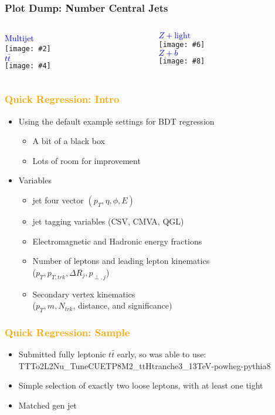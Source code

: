 \documentclass{beamer}
\newcommand{\fourfigs}[8]{
  \begin{columns}
    \begin{column}{0.3\linewidth}
      \centering
      \textcolor{blue}{#1} \\
      \texttt{[image: \#2]} \\
      \textcolor{blue}{#3} \\
      \texttt{[image: \#4]}
    \end{column}
    \begin{column}{0.3\linewidth}
      \centering
      \textcolor{blue}{#5} \\
      \texttt{[image: \#6]} \\
      \textcolor{blue}{#7} \\
      \texttt{[image: \#8]}
    \end{column}
}
\newcommand{\ttbar}{\ensuremath{t\bar{t}} \hspace{2pt}}
\begin{document}
\begin{frame}
  \frametitle{Plot Dump: Number Central Jets}
  \fourfigs{Multijet}
           {171201/ZvvHbb_multijet_nJet.pdf}
           {\ttbar}
           {171201/ZvvHbb_scaledtt_nJet.pdf}
           {$Z + \mathrm{light}$}
           {171201/ZvvHbb_lightz_nJet.pdf}
           {$Z + b$}
           {171201/ZvvHbb_heavyz_nJet.pdf}
  \end{columns}
\end{frame}

\begin{frame}
  \frametitle{\textcolor{orange}{Quick Regression: Intro}}

  \begin{itemize}
  \item Using the default example settings for BDT regression
    \begin{itemize}
    \item A bit of a black box
    \item Lots of room for improvement
    \end{itemize}
  \item Variables
    \begin{itemize}
    \item jet four vector $(p_T, \eta, \phi, E)$
    \item jet tagging variables (CSV, CMVA, QGL)
    \item Electromagnetic and Hadronic energy fractions
    \item Number of leptons and leading lepton kinematics \\
      ($p_T, p_{T,trk}, \Delta R_j, p_{\perp,j}$)
    \item Secondary vertex kinematics \\
      ($p_T, m, N_{trk}$, distance, and significance)
    \end{itemize}
  \end{itemize}

\end{frame}

\begin{frame}
  \frametitle{\textcolor{orange}{Quick Regression: Sample}}

  \begin{itemize}
  \item Submitted fully leptonic \ttbar early, so was able to use: \\
    TTTo2L2Nu\_TuneCUETP8M2\_ttHtranche3\_13TeV-powheg-pythia8
  \item Simple selection of exactly two loose leptons, with at least one tight
  \item Matched gen jet
  \end{itemize}

\end{frame}
\end{document}
